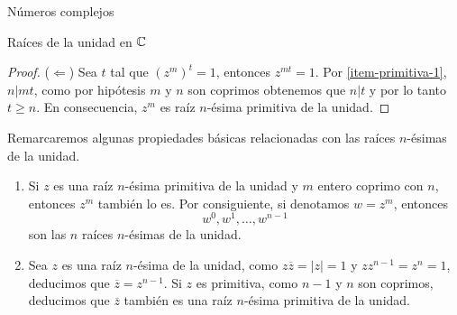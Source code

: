 \begin{chapter}{N\'umeros complejos}
\begin{section}{Raíces de la unidad en $\mathbb C$}
\begin{proof}
      ($\Leftarrow$) Sea $t$ tal que $(z^m)^t = 1$,  entonces $z^{mt} =1$. Por \ref{item-primitiva-1}, $n | mt$, como por hipótesis $m$ y $n$ son coprimos obtenemos que $n |t$ y por lo tanto $t \ge n$. En consecuencia, $z^m$  es raíz $n$-ésima primitiva de la unidad.
  \end{proof}

  \begin{observacion*} Remarcaremos algunas propiedades básicas relacionadas con las raíces $n$-ésimas de la unidad.
      \begin{enumerate}
          \item Si $z$ es una raíz $n$-ésima primitiva de la unidad y $m$  entero coprimo con $n$, entonces ${z}^m$ también lo es.  Por consiguiente, si denotamos $w = z^m$, entonces
                $$
                    w^0, w^1,\ldots,w^{n-1}
                $$
                son las $n$ raíces $n$-ésimas de la unidad.
          \item Sea $z$ es una raíz $n$-ésima de la unidad, como $z\overline{z} = |z| =1$ y $zz^{n-1} = z^n = 1$,  deducimos que $\overline{z} = z^{n-1}$. Si $z$  es primitiva,  como $n-1$ y $n$ son coprimos, deducimos que $\overline{z}$  también es una raíz $n$-ésima primitiva de la unidad.
      \end{enumerate}
  \end{observacion*}



 \end{section}
\end{chapter}





